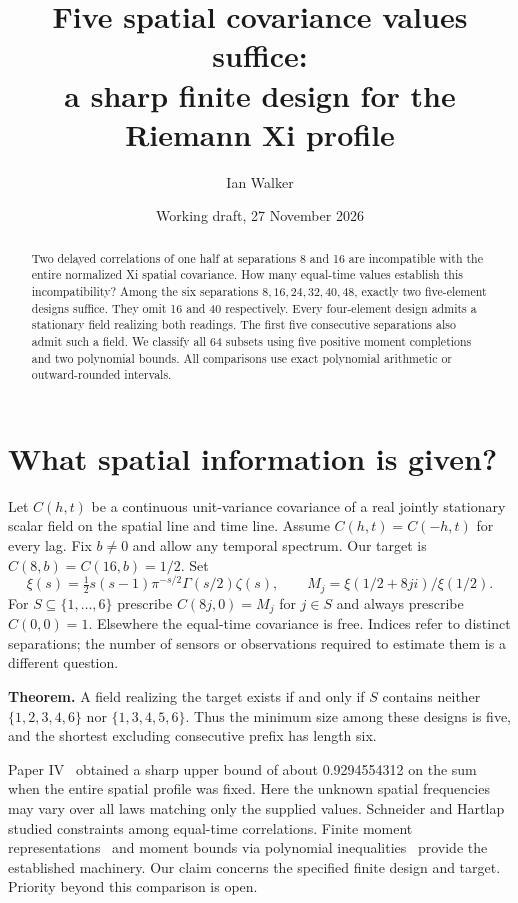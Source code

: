 \documentclass[11pt]{article}
\title{Five spatial covariance values suffice:\\a sharp finite design for the Riemann Xi profile}
\author{Ian Walker}
\date{Working draft, 27 November 2026}
\begin{document}
\maketitle
\begin{abstract}
Two delayed correlations of one half at separations 8 and 16 are incompatible with the entire normalized Xi spatial covariance. How many equal-time values establish this incompatibility? Among the six separations $8,16,24,32,40,48$, exactly two five-element designs suffice. They omit 16 and 40 respectively. Every four-element design admits a stationary field realizing both readings. The first five consecutive separations also admit such a field. We classify all 64 subsets using five positive moment completions and two polynomial bounds. All comparisons use exact polynomial arithmetic or outward-rounded intervals.
\end{abstract}
\section{What spatial information is given?}
Let $C(h,t)$ be a continuous unit-variance covariance of a real jointly stationary scalar field on the spatial line and time line. Assume $C(h,t)=C(-h,t)$ for every lag. Fix $b\ne0$ and allow any temporal spectrum. Our target is $C(8,b)=C(16,b)=1/2$. Set
\[
 \xi(s)=\tfrac12 s(s-1)\pi^{-s/2}\Gamma(s/2)\zeta(s),\qquad
 M_j=\xi(1/2+8ji)/\xi(1/2).
\]
For $S\subseteq\{1,\ldots,6\}$ prescribe $C(8j,0)=M_j$ for $j\in S$ and always prescribe $C(0,0)=1$. Elsewhere the equal-time covariance is free. Indices refer to distinct separations; the number of sensors or observations required to estimate them is a different question.

\textbf{Theorem.} A field realizing the target exists if and only if $S$ contains neither $\{1,2,3,4,6\}$ nor $\{1,3,4,5,6\}$. Thus the minimum size among these designs is five, and the shortest excluding consecutive prefix has length six.

Paper IV~\cite{walker} obtained a sharp upper bound of about 0.9294554312 on the sum when the entire spatial profile was fixed. Here the unknown spatial frequencies may vary over all laws matching only the supplied values. Schneider and Hartlap~\cite{sh} studied constraints among equal-time correlations. Finite moment representations~\cite{sch} and moment bounds via polynomial inequalities~\cite{bp} provide the established machinery. Our claim concerns the specified finite design and target. Priority beyond this comparison is open.
\end{document}
